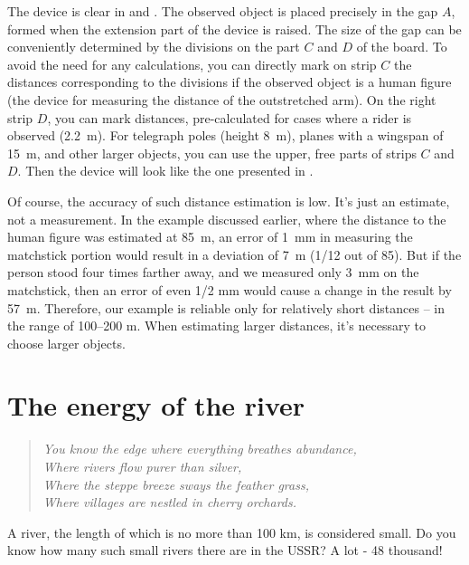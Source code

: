 The device is clear in  and . The observed object is placed precisely in the gap $A$, formed when the extension part of the device is raised. The size of the gap can be conveniently determined by the divisions on the part $C$ and $D$ of the board. To avoid the need for any calculations, you can directly mark on strip $C$ the distances corresponding to the divisions if the observed object is a human figure (the device for measuring the distance of the outstretched arm). On the right strip $D$, you can mark distances, pre-calculated for cases where a rider is observed (\SI{2.2}{\meter}). For telegraph poles (height \SI{8}{\meter}), planes with a wingspan of \SI{15}{\meter}, and other larger objects, you can use the upper, free parts of strips $C$ and $D.$ Then the device will look like the one presented in .





Of course, the accuracy of such distance estimation is low. It's just an estimate, not a measurement. In the example discussed earlier, where the distance to the human figure was estimated at \SI{85}{\meter}, an error of \SI{1}{\milli\meter} in measuring the matchstick portion would result in a deviation of \SI{7}{\meter} (1/12 out of 85). But if the person stood four times farther away, and we measured only \SI{3}{\milli\meter} on the matchstick, then an error of even 1/2 mm would cause a change in the result by \SI{57}{\meter}. Therefore, our example is reliable only for relatively short distances -- in the range of 100--200 m. When estimating larger distances, it's necessary to choose larger objects.


\section{The energy of the river}
\label{sec-2.6}

\begin{quote}
\emph{You know the edge where everything breathes abundance,\\
Where rivers flow purer than silver, \\
Where the steppe breeze sways the feather grass, \\
Where villages are nestled in cherry orchards.}\\[-10pt]
\end{quote}


A river, the length of which is no more than 100 km, is considered small. Do you know how many such small rivers there are in the USSR? A lot - 48 thousand!

